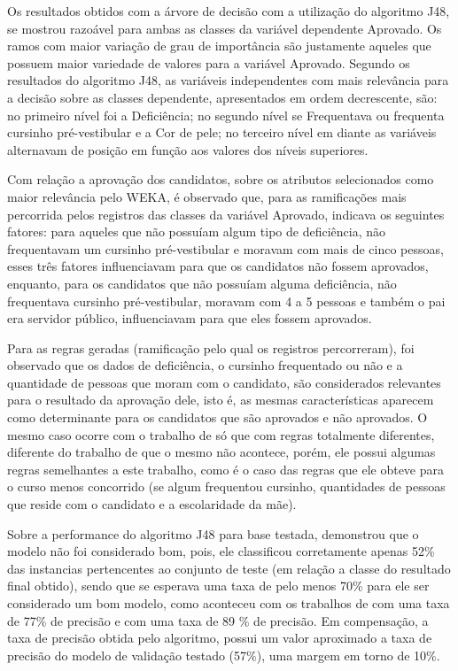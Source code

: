 \par
Os resultados obtidos com a árvore de decisão com a utilização do algoritmo J48, se mostrou razoável para ambas as classes da variável dependente Aprovado. Os ramos com maior variação de grau de importância são justamente aqueles que possuem maior variedade de valores para a variável Aprovado. Segundo os resultados do algoritmo J48, as variáveis independentes com mais relevância para a decisão sobre as classes dependente, apresentados em ordem decrescente, são: no primeiro nível foi a Deficiência; no segundo nível se Frequentava ou frequenta cursinho pré-vestibular e a Cor de pele; no terceiro nível em diante as variáveis alternavam de posição em função aos valores dos níveis superiores.

\par
Com relação a aprovação dos candidatos, sobre os atributos selecionados como maior relevância pelo WEKA, é observado que, para as ramificações mais percorrida pelos registros das classes da variável Aprovado, indicava os seguintes fatores: para aqueles que não possuíam algum tipo de deficiência, não frequentavam um cursinho pré-vestibular e moravam com mais de cinco pessoas, esses três fatores influenciavam para que os candidatos não fossem aprovados, enquanto, para os candidatos que não possuíam alguma deficiência, não frequentava cursinho pré-vestibular, moravam com 4 a 5 pessoas e também o pai era servidor público, influenciavam para que eles fossem aprovados.

\par
Para as regras geradas (ramificação pelo qual os registros percorreram),  foi observado que os dados de deficiência, o cursinho frequentado ou não e a quantidade de pessoas que moram com o candidato, são considerados relevantes para o resultado da aprovação dele, isto é, as mesmas características aparecem como determinante para os candidatos que são aprovados e não aprovados.  O mesmo caso ocorre com o trabalho de  só que com regras totalmente diferentes, diferente do trabalho de  que o mesmo não acontece, porém, ele possui algumas regras semelhantes a este trabalho, como é o caso das regras que ele obteve para o curso menos concorrido (se algum frequentou cursinho, quantidades de pessoas que reside com o candidato e a escolaridade da mãe).


\par
Sobre a performance do algoritmo J48 para base testada, demonstrou que o modelo não foi considerado bom, pois, ele classificou corretamente apenas 52\% das instancias pertencentes ao conjunto de teste (em relação a classe do resultado final obtido), sendo que se esperava uma taxa de pelo menos 70\% para ele ser considerado um bom modelo, como aconteceu com os trabalhos de   com uma taxa de 77\% de precisão e  com uma taxa de 89 \% de precisão. Em compensação, a taxa de precisão obtida pelo algoritmo, possui um valor aproximado a taxa de precisão do modelo de validação testado (57\%), uma margem em torno de 10\%.


